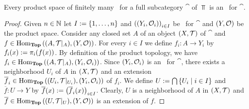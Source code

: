 \begin{proposition}
	Every product space of finitely many \anes\ for a full subcategory $\cat$ of $\Top$ is an \ane\ for $\cat$. 
\end{proposition}
\begin{proof}
	Given $n \in \mathbb N$ let $I := {\left \{ 1, \dots, n \right \}}$ and $\pbraces{\indtspace[Y][O]}_{i \in I}$ be \anes\ for $\cat$ and $\tspace[Y][O]$ be the product space. Consider any closed set $A$ of an object $\tspace$ of $\cat$ and $f \in \Hom_\Top\pbraces{\reltspace, \tspace[Y][O]}$. For every $i \in I$ we define $f_i: A \to Y_i$ by $f_i(x) := \pi_i{\left ( f(x) \right )}$. By definition of the product topology, we have $f_i \in \Hom_\Top\pbraces{\reltspace, \indtspace[Y][O]}$. Since $\indtspace[Y][O]$ is an \ane\ for $\cat$, there exists a neighborhood $U_i$ of $A$ in $\tspace$ and an extension $\overline{f}_i \in \Hom_\Top\pbraces{\reltspace[U_i], \indtspace[Y][O]}$ of $f_i$. We define $U := \bigcap {\left \{ U_i \mid i \in I \right \}}$ and $\overline{f}: U \to Y$ by $\overline{f}(x) := {\left ( \overline{f}_i(x) \right )}_{i \in I}$. Clearly, $U$ is a neighborhood of $A$ in $\tspace$ and $\overline{f} \in \Hom_\Top\pbraces{\reltspace[U], \tspace[Y][O]}$ is an extension of $f$. 
\end{proof}
